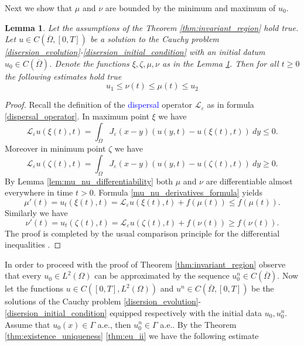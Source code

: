 \documentclass[12pt, a4paper]{article}
\theoremstyle{break}
\theoremstyle{break}
\theoremstyle{break}
\theoremstyle{break}
\newtheorem{lem}{Lemma}[section]
\theoremstyle{break}
\newcommand{\Leo}{\mathcal{L}_{\varepsilon}}
\newcommand{\Leb}{L^2\left(\Omega\right)}
\begin{document}
Next we show that $\mu$ and $\nu$ are bounded by the minimum and maximum of $u_0$.

\begin{lem}
    Let the assumptions of the Theorem \ref{thm:invariant_region} hold true. Let $u \in C\left(\overline{\Omega}, [0, T]\right)$ be a solution to the Cauchy problem \eqref{disersion_evolution}-\eqref{disersion_initial_condition} with an initial datum $u_0 \in C(\overline{\Omega})$. Denote the functions $\xi, \zeta, \mu, \nu$ as in the Lemma \ref{lem:invariant_region_cont}. Then for all $t \geq 0$ the following estimates hold true
    \begin{equation*}
        u_1 \leq \nu(t) \leq \mu(t) \leq u_2
    \end{equation*}
    \label{lem:invariant_region_cont}
\end{lem}
\begin{proof}
    Recall the definition of the \textcolor{blue}{dispersal} operator $\Leo$ as in formula \eqref{dispersal_operator}. In maximum point $\xi$ we have
    \begin{equation*}
        \Leo u(\xi(t), t) = \int_\Omega J_\varepsilon(x-y) \left(u(y, t) - u(\xi(t), t)\right)\:dy \leq 0.
    \end{equation*}
    Moreover in minimum point $\zeta$ we have
    \begin{equation*}
        \Leo u(\zeta(t), t) = \int_\Omega J_\varepsilon(x-y) \left(u(y, t) - u(\zeta(t), t)\right)\:dy \geq 0.
    \end{equation*}
    By Lemma \ref{lem:mu_nu_differentiability} both $\mu$ and $\nu$ are differentiable almost everywhere in time $t > 0$. Formula \eqref{mu_nu_derivatives_formula} yields
    $$\mu'(t) = u_t(\xi(t), t) = \Leo u(\xi(t), t) + f(\mu(t)) \leq f(\mu(t)).$$
    Similarly we have
    $$\nu'(t) = u_t(\zeta(t), t) = \Leo u(\zeta(t), t) + f(\nu(t)) \geq f(\nu(t)).$$
    The proof is completed by the usual comparison principle for the differential inequalities \cite{Petrovitch1901}.
\end{proof}
 
In order to proceed with the proof of Theorem \ref{thm:invariant_region} observe that every $u_0 \in L^2(\Omega)$ can be approximated by the sequence $u^n_0 \in C(\overline{\Omega})$. Now let the functions $u \in C([0, T], \Leb)$ and $u^n \in C(\overline{\Omega}, [0, T])$ be the solutions of the Cauchy problem \eqref{disersion_evolution}-\eqref{disersion_initial_condition} equipped respectively with the initial data $u_0, u^n_0$. Assume that $u_0(x) \in \Gamma$ a.e., then $u_0^n \in \Gamma$ a.e.. By the Theorem \ref{thm:existence_uniqueness} \ref{thm:eu_ii} we have the following estimate
\end{document}
